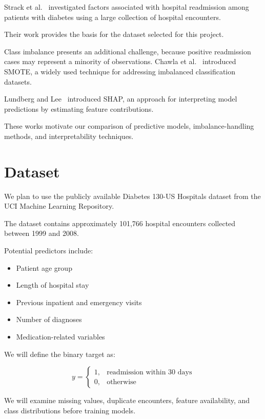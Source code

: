 \documentclass[conference]{IEEEtran}
\begin{document}
Strack et al.~\cite{strack2014} investigated factors
associated with hospital readmission among patients
with diabetes using a large collection of hospital
encounters.

Their work provides the basis for the dataset
selected for this project.

Class imbalance presents an additional challenge,
because positive readmission cases may represent
a minority of observations. Chawla et
al.~\cite{chawla2002} introduced SMOTE, a widely
used technique for addressing imbalanced
classification datasets.

Lundberg and Lee~\cite{lundberg2017} introduced
SHAP, an approach for interpreting model
predictions by estimating feature contributions.

These works motivate our comparison of predictive
models, imbalance-handling methods, and
interpretability techniques.

\section{Dataset}

We plan to use the publicly available
Diabetes 130-US Hospitals dataset from the
UCI Machine Learning Repository.

The dataset contains approximately 101,766
hospital encounters collected between 1999
and 2008.

Potential predictors include:
\begin{itemize}
    \item Patient age group
    \item Length of hospital stay
    \item Previous inpatient and emergency visits
    \item Number of diagnoses
    \item Medication-related variables
\end{itemize}

We will define the binary target as:

\begin{equation}
y =
\begin{cases}
1, & \text{readmission within 30 days}\\
0, & \text{otherwise}
\end{cases}
\end{equation}

We will examine missing values, duplicate
encounters, feature availability, and class
distributions before training models.
\end{document}
